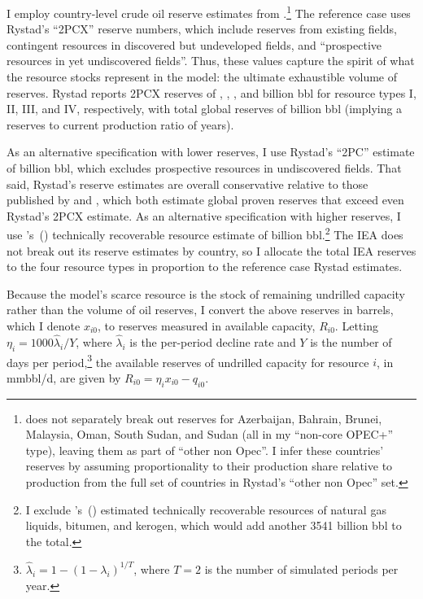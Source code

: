 \documentclass[12pt]{article}
\newcommand\cites[1]{\citeauthor{#1}'s\ (\citeyear{#1})}
\begin{document}
I employ country-level crude oil reserve estimates from \cite{rystadreserves2023}.\footnote{\cite{rystadreserves2023} does not separately break out reserves for Azerbaijan, Bahrain, Brunei, Malaysia, Oman, South Sudan, and Sudan (all in my ``non-core OPEC+'' type), leaving them as part of ``other non Opec''. I infer these countries' reserves by assuming proportionality to their production share relative to production from the full set of countries in Rystad's ``other non Opec'' set.} The reference case uses Rystad's ``2PCX'' reserve numbers, which include reserves from existing fields, contingent resources in discovered but undeveloped fields, and ``prospective resources in yet undiscovered fields''. Thus, these values capture the spirit of what the resource stocks represent in the model: the ultimate exhaustible volume of reserves. Rystad reports 2PCX reserves of \unskip, \unskip, \unskip, and billion bbl for resource types I, II, III, and IV, respectively, with total global reserves of billion bbl (implying a reserves to current production ratio of years).

As an alternative specification with lower reserves, I use Rystad's ``2PC'' estimate of billion bbl, which excludes prospective resources in undiscovered fields. That said, Rystad's reserve estimates are overall conservative relative to those published by \cite{EIAintlreserves} and \cite{IEAforecast2023}, which both estimate global proven reserves that exceed even Rystad's 2PCX estimate. As an alternative specification with higher reserves, I use \cites{IEAforecast2023} technically recoverable resource estimate of billion bbl.\footnote{I exclude \cites{IEAforecast2023} estimated technically recoverable resources of natural gas liquids, bitumen, and kerogen, which would add another 3541 billion bbl to the total.} The IEA does not break out its reserve estimates by country, so I allocate the total IEA reserves to the four resource types in proportion to the reference case Rystad estimates.

Because the model's scarce resource is the stock of remaining undrilled capacity rather than the volume of oil reserves, I convert the above reserves in barrels, which I denote $x_{i0}$, to reserves measured in available capacity, $R_{i0}$. Letting $\eta_i=1000\hat{\lambda}_i/Y$, where $\hat{\lambda}_i$ is the per-period decline rate and $Y$ is the number of days per period,\footnote{$\hat{\lambda}_i=1-(1-\lambda_i)^{1/T}$, where $T=2$ is the number of simulated periods per year.} the available reserves of undrilled capacity for resource $i$, in mmbbl/d, are given by $R_{i0}=\eta_ix_{i0}-q_{i0}$.
\end{document}
